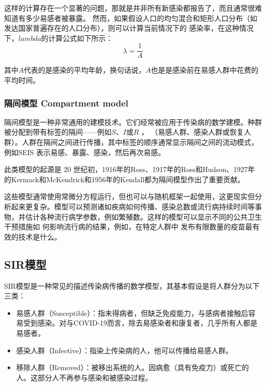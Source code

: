 \documentclass[bwprint]{gmcmthesis}
\numberwithin{figure}{section}
\begin{document}
\par 这样的计算存在一个显著的问题，那就是并非所有新感染都报告了，而且通常很难知道有多少易感者被暴露。
然而，如果假设人口的均匀混合和矩形人口分布（如发达国家普遍存在的人口分布），则可以计算当前情况下的
感染率，在这种情况下，$lambda$的计算公式如下所示：
\begin{equation} \label{}
    \lambda =\dfrac{1}{A}
\end{equation}
\par 其中$A$代表的是感染的平均年龄，换句话说，$A$也是是感染前在易感人群中花费的平均时间。


\subsubsection{隔间模型 Compartment model}
\par 隔间模型是一种非常通用的建模技术。它们经常被应用于传染病的数学建模。种群被分配到带有标签的隔间——例如$S$、$I$或$R$ ，
（易感人群、感染人群或恢复人群）。人群在隔间之间进行传播，其中标签的顺序通常显示隔间之间的流动模式，例如SEIS 表示易感、暴露、感染，然后再次易感。
\par 此类模型的起源是 20 世纪初，1916年的Ross、1917年的Ross和Hudson、1927年的Kermack和McKendrick和1956年的Kendall都为隔间模型作出了重要贡献。
\par 这些模型通常使用常微分方程运行，但也可以与随机框架一起使用，这更现实但分析起来更复杂。模型可以预测诸如疾病如何传播、感染总数或流行病持续时间等事物，并估计各种流行病学参数，例如繁殖数。这样的模型可以显示不同的公共卫生干预措施如
何影响流行病的结果，例如，在特定人群中 发布有限数量的疫苗最有效的技术是什么。


\subsection{SIR模型}
SIR模型是一种常见的描述传染病传播的数学模型，其基本假设是将人群分为以下三类：

\begin{itemize}
    \item 易感人群（Susceptible）：指未得病者，但缺乏免疫能力，与感病者接触后容易受到感染。对与COVID-19而言，除去易感染者和康复者，几乎所有人都是易感者。
    \item 感染人群（Infective）：指染上传染病的人，他可以传播给易感人群。
    \item 移除人群（Removed）：被移出系统的人。因病愈（具有免疫力）或死亡的人。这部分人不再参与感染和被感染过程。
\end{itemize}
\end{document}
